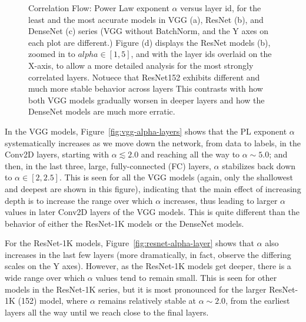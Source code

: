 \begin{figure}[t]
{}    
    \caption{Correlation Flow: Power Law exponent $\alpha$ versus layer id, for the least and the most accurate
      models in VGG (a), ResNet (b), and DenseNet (c) series (VGG without BatchNorm, and the Y axes on each plot are different.)  
             Figure (d) displays the ResNet models (b), zoomed in to $alpha\in[1,5]$, and with the layer ids overlaid on the X-axis, to
             allow a more detailed analysis for the most strongly correlated layers.
             Notuece that ResNet152 exhibits different and much more stable behavior across layers
             This contrasts with how both VGG models gradually worsen in deeper layers and how the DenseNet models are much more erratic.  
            }
    \label{fig:3models-alpha-layers}
\end{figure}

In the VGG models, Figure~\ref{fig:vgg-alpha-layers} shows that the PL exponent $\alpha$ systematically increases as we move down the network, from data to labels, in the Conv2D layers, starting with $\alpha\lesssim 2.0$ and reaching all the way to $\alpha\sim 5.0$; and then, in the last three, large, fully-connected (FC) layers, $\alpha$ stabilizes back down to $\alpha\in[2,2.5]$.
This is seen for all the VGG models (again, only the shallowest and deepest are shown in this figure), indicating that the main effect of increasing depth is to increase the range over which $\alpha$ increases, thus leading to larger $\alpha$ values in later Conv2D layers of the VGG models.
This is quite different than the behavior of either the ResNet-1K models or the DenseNet models.

For the ResNet-1K models, Figure~\ref{fig:resnet-alpha-layer} shows that $\alpha$ also increases in the last few layers (more dramatically, in fact, observe the differing scales on the Y axes).
However, as the ResNet-1K models get deeper, there is a wide range over which $\alpha$ values tend to remain small.
This is seen for other models in the ResNet-1K series, but it is most pronounced for the larger ResNet-1K (152) model, where $\alpha$ remains relatively stable at $\alpha\sim 2.0$, from the earliest layers all the way until we reach close to the final layers.  

